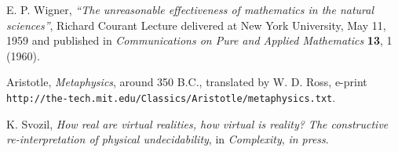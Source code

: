 \begin{thebibliography}{99}
 E. P. Wigner,
 {\sl ``The unreasonable effectiveness of mathematics in the natural
 sciences''}, Richard Courant Lecture delivered at New York University,
 May 11, 1959 and published in {\it
 Communications on Pure and Applied Mathematics} {\bf 13}, 1 (1960).

Aristotle, {\sl Metaphysics}, around 350 B.C.,
translated by W. D. Ross, e-print
{\tt http://the-tech.mit.edu/Classics/Aristotle/metaphysics.txt}.

K. Svozil,
{\sl How real are virtual realities,
how virtual is reality?
The constructive re-interpretation of physical undecidability}, in {\sl
Complexity}, {\it in press}.

\end{thebibliography}
\newpage
 \tableofcontents


